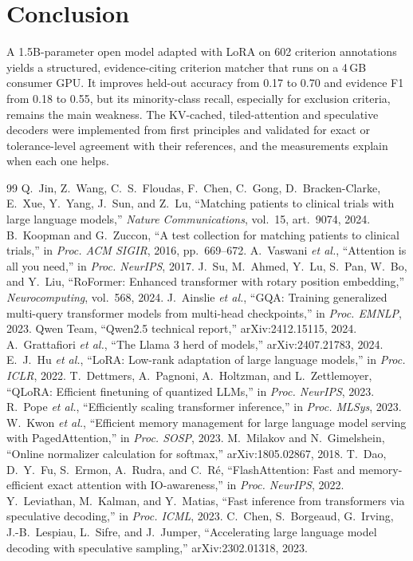 \documentclass[conference]{IEEEtran}
\begin{document}
\section{Conclusion}
A 1.5B-parameter open model adapted with LoRA on 602 criterion annotations yields a structured,
evidence-citing criterion matcher that runs on a 4\,GB consumer GPU. It improves held-out accuracy from 0.17
to 0.70 and evidence F1 from 0.18 to 0.55, but its minority-class recall, especially for exclusion criteria,
remains the main weakness. The KV-cached, tiled-attention
and speculative decoders were implemented from first principles and validated for exact or
tolerance-level agreement with their references, and the measurements explain when each one helps.


\begin{thebibliography}{99}
 Q.~Jin, Z.~Wang, C.~S.~Floudas, F.~Chen, C.~Gong, D.~Bracken-Clarke, E.~Xue, Y.~Yang, J.~Sun, and Z.~Lu, ``Matching patients to clinical trials with large language models,'' \emph{Nature Communications}, vol.~15, art.~9074, 2024.
 B.~Koopman and G.~Zuccon, ``A test collection for matching patients to clinical trials,'' in \emph{Proc. ACM SIGIR}, 2016, pp.~669--672.
 A.~Vaswani \emph{et al.}, ``Attention is all you need,'' in \emph{Proc. NeurIPS}, 2017.
 J.~Su, M.~Ahmed, Y.~Lu, S.~Pan, W.~Bo, and Y.~Liu, ``RoFormer: Enhanced transformer with rotary position embedding,'' \emph{Neurocomputing}, vol.~568, 2024.
 J.~Ainslie \emph{et al.}, ``GQA: Training generalized multi-query transformer models from multi-head checkpoints,'' in \emph{Proc. EMNLP}, 2023.
 Qwen Team, ``Qwen2.5 technical report,'' arXiv:2412.15115, 2024.
 A.~Grattafiori \emph{et al.}, ``The Llama 3 herd of models,'' arXiv:2407.21783, 2024.
 E.~J.~Hu \emph{et al.}, ``LoRA: Low-rank adaptation of large language models,'' in \emph{Proc. ICLR}, 2022.
 T.~Dettmers, A.~Pagnoni, A.~Holtzman, and L.~Zettlemoyer, ``QLoRA: Efficient finetuning of quantized LLMs,'' in \emph{Proc. NeurIPS}, 2023.
 R.~Pope \emph{et al.}, ``Efficiently scaling transformer inference,'' in \emph{Proc. MLSys}, 2023.
 W.~Kwon \emph{et al.}, ``Efficient memory management for large language model serving with PagedAttention,'' in \emph{Proc. SOSP}, 2023.
 M.~Milakov and N.~Gimelshein, ``Online normalizer calculation for softmax,'' arXiv:1805.02867, 2018.
 T.~Dao, D.~Y.~Fu, S.~Ermon, A.~Rudra, and C.~R\'e, ``FlashAttention: Fast and memory-efficient exact attention with IO-awareness,'' in \emph{Proc. NeurIPS}, 2022.
 Y.~Leviathan, M.~Kalman, and Y.~Matias, ``Fast inference from transformers via speculative decoding,'' in \emph{Proc. ICML}, 2023.
 C.~Chen, S.~Borgeaud, G.~Irving, J.-B.~Lespiau, L.~Sifre, and J.~Jumper, ``Accelerating large language model decoding with speculative sampling,'' arXiv:2302.01318, 2023.
\end{thebibliography}
\end{document}
